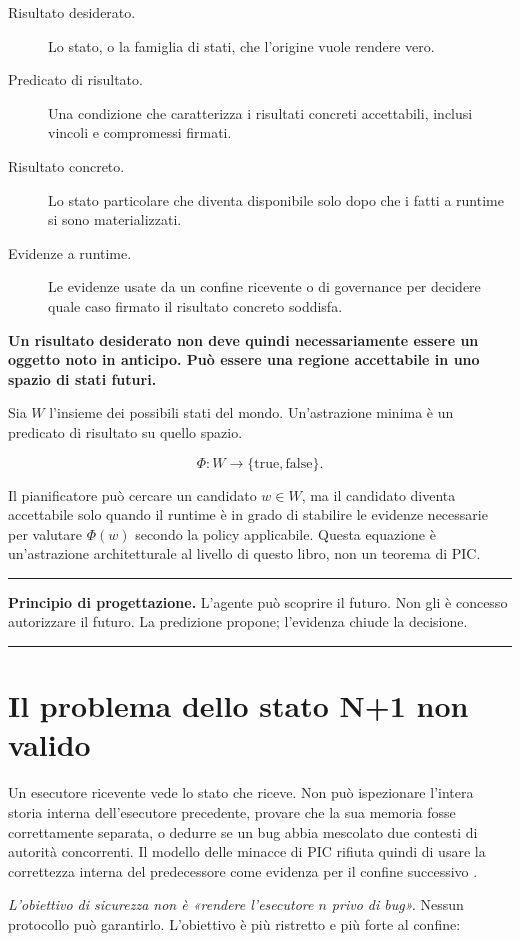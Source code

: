 \documentclass[10pt,oneside,openany]{book}
\newcommand{\principle}[1]{%
  \vspace{4pt}
  \noindent\begin{minipage}{\linewidth}
  \hrule\vspace{5pt}
  \small\sffamily\raggedright\textbf{Principio di progettazione.} #1
  \vspace{5pt}\hrule
  \end{minipage}\vspace{4pt}
}
\begin{document}
\begin{description}
\item[Risultato desiderato.] Lo stato, o la famiglia di stati, che l'origine vuole rendere vero.
\item[Predicato di risultato.] Una condizione che caratterizza i risultati concreti accettabili, inclusi vincoli e compromessi firmati.
\item[Risultato concreto.] Lo stato particolare che diventa disponibile solo dopo che i fatti a runtime si sono materializzati.
\item[Evidenze a runtime.] Le evidenze usate da un confine ricevente o di governance per decidere quale caso firmato il risultato concreto soddisfa.
\end{description}

\textbf{Un risultato desiderato non deve quindi necessariamente essere un oggetto noto in anticipo. Può essere una regione accettabile in uno spazio di stati futuri.}

Sia $W$ l'insieme dei possibili stati del mondo. Un'astrazione minima è un predicato di risultato su quello spazio.
\begin{formulabox}
\[
\Phi : W \rightarrow \{\mathrm{true},\mathrm{false}\}.
\]
\end{formulabox}
Il pianificatore può cercare un candidato $w\in W$, ma il candidato diventa accettabile solo quando il runtime è in grado di stabilire le evidenze necessarie per valutare $\Phi(w)$ secondo la policy applicabile. Questa equazione è un'astrazione architetturale al livello di questo libro, non un teorema di PIC.

\principle{L'agente può scoprire il futuro. Non gli è concesso autorizzare il futuro. La predizione propone; l'evidenza chiude la decisione.}

\chapter{Il problema dello stato N+1 non valido}

Un esecutore ricevente vede lo stato che riceve. Non può ispezionare l'intera storia interna dell'esecutore precedente, provare che la sua memoria fosse correttamente separata, o dedurre se un bug abbia mescolato due contesti di autorità concorrenti. Il modello delle minacce di PIC rifiuta quindi di usare la correttezza interna del predecessore come evidenza per il confine successivo \cite{picwhy}.

\emph{L'obiettivo di sicurezza non è «rendere l'esecutore $n$ privo di bug».} Nessun protocollo può garantirlo. L'obiettivo è più ristretto e più forte al confine:
\end{document}
